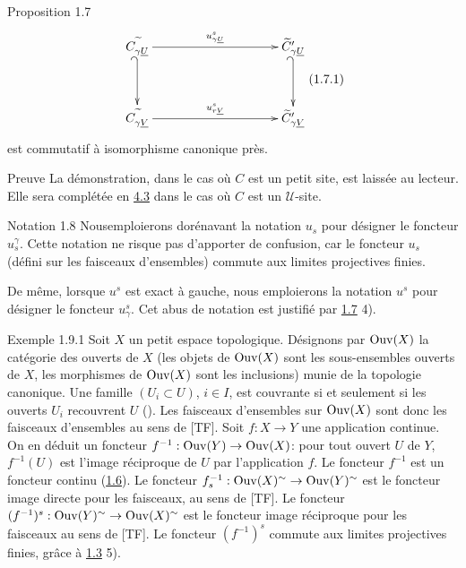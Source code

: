 \documentclass[10pt]{../fichiers-configuration-latex/smfart}
\begin{document}
\begin{enonce*}{Proposition 1.7}
\[\vcenter{
\xymatrix@C=3.5cm@R=1.25cm{ C^{\widetilde{\phantom{a}}}_{\gamma
\underline{U}} \ar[r]^{u_{\gamma \underline{U}}^{s}}
\ar@{_{(}->}[d]&
\widetilde{C}'_{\gamma \underline{U}} \ar@{_{(}->}[d]\\
C^{\widetilde{\phantom{a}}}_{\gamma \underline{V}}
\ar[r]^{u^s_{r\underline{V}}}  &  \widetilde{C}'_{\gamma
\underline{V}} }}\leqno{(1.7.1)}
\]
est commutatif à isomorphisme canonique près.
\end{enonce*}

\begin{enonce*}[remark]{Preuve}
La démonstration, dans le cas où $C$ est un petit site, est
laissée au lecteur. Elle sera complétée en
\hyperref[III.subsec4.3]{4.3} dans le cas où $C$ est un $𝒰$-site.
\end{enonce*}

\begin{enonce*}[remark]{Notation 1.8}
Nous\pageoriginale emploierons dorénavant la notation $u_s$ pour
désigner le foncteur $u^{\gamma}_s$. Cette notation ne risque
pas d'apporter de confusion, car le foncteur $u_s$ (défini sur
les faisceaux d'ensembles) commute aux limites projectives finies.
\end{enonce*}

De même, lorsque $u^s$ est exact à gauche, nous emploierons la
notation $u^s$ pour désigner le foncteur $u^s_{\gamma}$. Cet
abus de notation est justifié par \hyperref[III.prop1.7]{1.7} 4).

\begin{enonce*}[remark]{Exemple 1.9.1}
Soit $X$ un petit espace topologique. Désignons par $\operatorname{Ouv}(X)$ la
catégorie des ouverts de $X$ (les objets de $\operatorname{Ouv}(X)$ sont les
sous-ensembles ouverts de $X$, les morphismes de $\operatorname{Ouv}(X)$ sont les
inclusions) munie de la topologie canonique. Une famille
$(U_i\subset U)$, $i\in I$, est couvrante si et seulement si les
ouverts $U_i$ recouvrent $U$ (). Les faisceaux
d'ensembles sur $\operatorname{Ouv}(X)$ sont donc les faisceaux d'ensembles au
sens de [TF]. Soit $f:X\rightarrow Y$ une application continue. On
en déduit un foncteur $f^{-1}:\operatorname{Ouv}(Y)\rightarrow \operatorname{Ouv}(X)$: pour
tout ouvert $U$ de $Y$, $f^{-1}(U)$ est l'image réciproque de
$U$ par l'application $f$. Le foncteur $f^{-1}$ est un foncteur
continu (\hyperref[III.prop1.6]{1.6}). Le foncteur
$f^{-1}_s:\operatorname{Ouv}(X)^{\sim}\rightarrow \operatorname{Ouv}(Y)^{\sim}$ est le foncteur
image directe pour les faisceaux, au sens de [TF]. Le foncteur
$(f^{-1})^s:\operatorname{Ouv}(Y)^{\sim}\rightarrow \operatorname{Ouv}(X)^{\sim}$ est le
foncteur image réciproque pour les faisceaux au sens de [TF]. Le
foncteur $(f^{-1})^s$ commute aux limites projectives finies,
grâce à \hyperref[III.prop1.3]{1.3} 5).
\end{enonce*}
\end{document}
